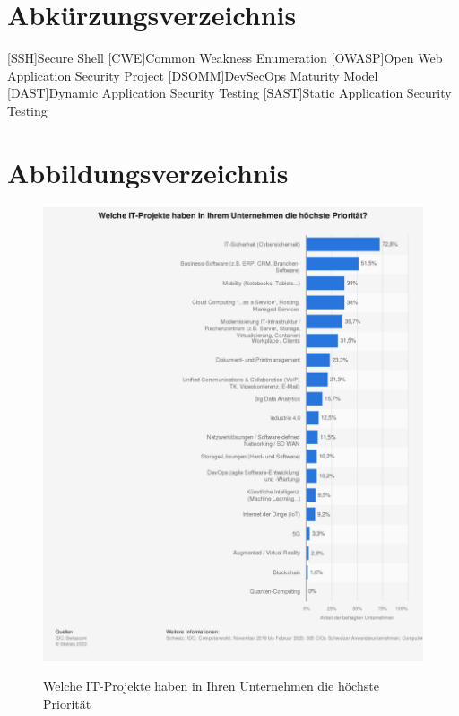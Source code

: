 \chapter{Abkürzungsverzeichnis}

\begin{acronym}
	[SSH]{Secure Shell}	
	[CWE]{Common Weakness Enumeration}
	[OWASP]{Open Web Application Security Project}
	[DSOMM]{DevSecOps Maturity Model}
	[DAST]{Dynamic Application Security Testing}
	[SAST]{Static Application Security Testing}
\end{acronym}

\clearpage

\chapter{Abbildungsverzeichnis}


\begin{figure}[b!]
	{\caption{Welche IT-Projekte haben in Ihren Unternehmen die höchste Priorität}
		\label{FIG:statistic-it-projects}}
	{\includegraphics[width=1\textwidth]{figures/statistic-it-projekte.png}}
\end{figure}

